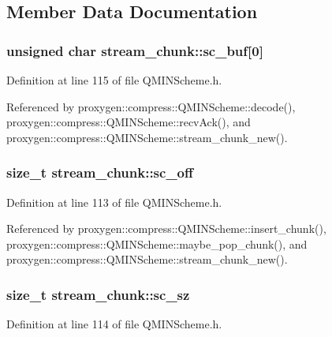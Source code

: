 \subsection{Member Data Documentation}
\subsubsection[{sc\+\_\+buf}]{\setlength{\rightskip}{0pt plus 5cm}unsigned char stream\+\_\+chunk\+::sc\+\_\+buf[0]}\label{structstream__chunk_ae50470383ad01ef30eceefcedfce75fe}


Definition at line 115 of file Q\+M\+I\+N\+Scheme.\+h.



Referenced by proxygen\+::compress\+::\+Q\+M\+I\+N\+Scheme\+::decode(), proxygen\+::compress\+::\+Q\+M\+I\+N\+Scheme\+::recv\+Ack(), and proxygen\+::compress\+::\+Q\+M\+I\+N\+Scheme\+::stream\+\_\+chunk\+\_\+new().

\subsubsection[{sc\+\_\+off}]{\setlength{\rightskip}{0pt plus 5cm}size\+\_\+t stream\+\_\+chunk\+::sc\+\_\+off}\label{structstream__chunk_a1d08372a5c36894981b425389f7b1d43}


Definition at line 113 of file Q\+M\+I\+N\+Scheme.\+h.



Referenced by proxygen\+::compress\+::\+Q\+M\+I\+N\+Scheme\+::insert\+\_\+chunk(), proxygen\+::compress\+::\+Q\+M\+I\+N\+Scheme\+::maybe\+\_\+pop\+\_\+chunk(), and proxygen\+::compress\+::\+Q\+M\+I\+N\+Scheme\+::stream\+\_\+chunk\+\_\+new().

\subsubsection[{sc\+\_\+sz}]{\setlength{\rightskip}{0pt plus 5cm}size\+\_\+t stream\+\_\+chunk\+::sc\+\_\+sz}\label{structstream__chunk_a86c0260d02838eff8e6ecf52385a7424}


Definition at line 114 of file Q\+M\+I\+N\+Scheme.\+h.



